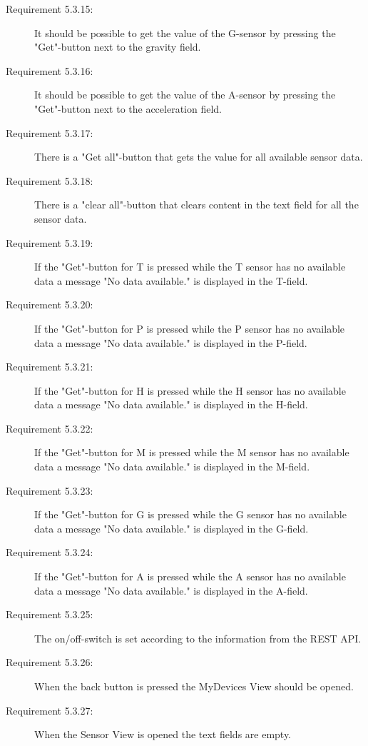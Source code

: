 \documentclass[a4paper]{article}
\begin{document}
\begin{description}
\item[Requirement 5.3.15:] It should be possible to get the value of the G-sensor by pressing the "Get"-button next to the gravity field.

\item[Requirement 5.3.16:] It should be possible to get the value of the A-sensor by pressing the "Get"-button next to the acceleration field.

\item[Requirement 5.3.17:] There is a "Get all"-button that gets the value for all available sensor data.

\item[Requirement 5.3.18:] There is a "clear all"-button that clears content in the text field for all the sensor data.

\item[Requirement 5.3.19:] If the "Get"-button for T is pressed while the T sensor has no available data a message "No data available." is displayed in the T-field.

\item[Requirement 5.3.20:] If the "Get"-button for P is pressed while the P sensor has no available data a message "No data available." is displayed in the P-field.

\item[Requirement 5.3.21:] If the "Get"-button for H is pressed while the H sensor has no available data a message "No data available." is displayed in the H-field.

\item[Requirement 5.3.22:] If the "Get"-button for M is pressed while the M sensor has no available data a message "No data available." is displayed in the M-field.

\item[Requirement 5.3.23:] If the "Get"-button for G is pressed while the G sensor has no available data a message "No data available." is displayed in the G-field.

\item[Requirement 5.3.24:] If the "Get"-button for A is pressed while the A sensor has no available data a message "No data available." is displayed in the A-field.

\item[Requirement 5.3.25:] The on/off-switch is set according to the information from the REST API.

\item[Requirement 5.3.26:] When the back button is pressed the MyDevices View should be opened.

\item[Requirement 5.3.27:] When the Sensor View is opened the text fields are empty.

\end{description}
\end{document}
